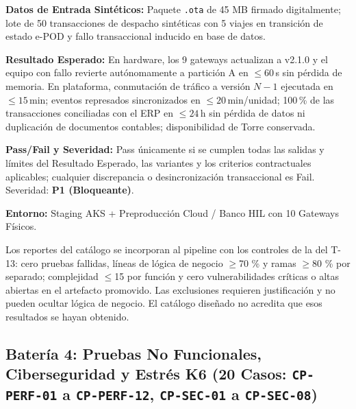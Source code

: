 \par\noindent \textbf{Datos de Entrada Sintéticos:} Paquete \texttt{.ota} de 45 MB firmado digitalmente; lote de 50 transacciones de despacho sintéticas con 5 viajes en transición de estado e-POD y fallo transaccional inducido en base de datos.\par
\par\noindent \textbf{Resultado Esperado:} En hardware, los 9 gateways actualizan a v2.1.0 y el equipo con fallo revierte autónomamente a partición A en $\le 60$\,s sin pérdida de memoria. En plataforma, conmutación de tráfico a versión $N-1$ ejecutada en $\le 15$\,min; eventos represados sincronizados en $\le 20$\,min/unidad; 100\,\% de las transacciones conciliadas con el ERP en $\le 24$\,h sin pérdida de datos ni duplicación de documentos contables; disponibilidad de Torre conservada.\par
\par\noindent \textbf{Pass/Fail y Severidad:} Pass únicamente si se cumplen todas las salidas y límites del Resultado Esperado, las variantes y los criterios contractuales aplicables; cualquier discrepancia o desincronización transaccional es Fail. Severidad: \textbf{P1 (Bloqueante)}.\par
\par\noindent \textbf{Entorno:} Staging AKS + Preproducción Cloud / Banco HIL con 10 Gateways Físicos.\par


Los reportes del catálogo se incorporan al pipeline con los controles de la  del T-13: cero pruebas fallidas, líneas de lógica de negocio \(\ge\)70 \% y ramas \(\ge\)80 \% por separado; complejidad \(\le\)15 por función y cero vulnerabilidades críticas o altas abiertas en el artefacto promovido. Las exclusiones requieren justificación y no pueden ocultar lógica de negocio. El catálogo diseñado no acredita que esos resultados se hayan obtenido.

\subsection*{Batería 4: Pruebas No Funcionales, Ciberseguridad y Estrés K6 (20 Casos: \texttt{C\allowbreak{}P\allowbreak{}-\allowbreak{}P\allowbreak{}E\allowbreak{}R\allowbreak{}F\allowbreak{}-\allowbreak{}0\allowbreak{}1\allowbreak{}} a \texttt{C\allowbreak{}P\allowbreak{}-\allowbreak{}P\allowbreak{}E\allowbreak{}R\allowbreak{}F\allowbreak{}-\allowbreak{}1\allowbreak{}2\allowbreak{}}, \texttt{C\allowbreak{}P\allowbreak{}-\allowbreak{}S\allowbreak{}E\allowbreak{}C\allowbreak{}-\allowbreak{}0\allowbreak{}1\allowbreak{}} a \texttt{C\allowbreak{}P\allowbreak{}-\allowbreak{}S\allowbreak{}E\allowbreak{}C\allowbreak{}-\allowbreak{}0\allowbreak{}8\allowbreak{}})}

